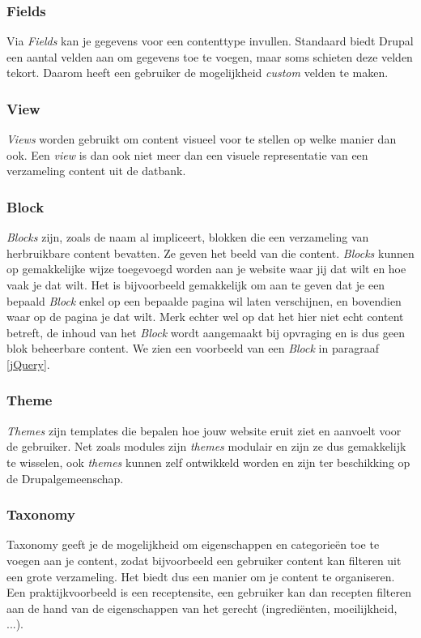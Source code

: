 \subsubsection{Fields}
Via \textit{Fields} kan je gegevens voor een contenttype invullen. Standaard biedt Drupal een aantal velden aan om gegevens toe te voegen, maar soms schieten deze velden tekort. Daarom heeft een gebruiker de mogelijkheid \textit{custom} velden te maken.

\subsubsection{View}
\textit{Views} worden gebruikt om content visueel voor te stellen op welke manier dan ook. Een \textit{view} is dan ook niet meer dan een visuele representatie van een verzameling content uit de datbank.

\subsubsection{Block}
\textit{Blocks} zijn, zoals de naam al impliceert, blokken die een verzameling van herbruikbare content bevatten. Ze geven het beeld van die content. \textit{Blocks} kunnen op gemakkelijke wijze toegevoegd worden aan je website waar jij dat wilt en hoe vaak je dat wilt. Het is bijvoorbeeld gemakkelijk om aan te geven dat je een bepaald \textit{Block} enkel op een bepaalde pagina wil laten verschijnen, en bovendien waar op de pagina je dat wilt. Merk echter wel op dat het hier niet echt content betreft, de inhoud van het \textit{Block} wordt aangemaakt bij opvraging en is dus geen blok beheerbare content. We zien een voorbeeld van een \textit{Block} in paragraaf \ref{jQuery}.

\subsubsection{Theme}
\textit{Themes} zijn templates die bepalen hoe jouw website eruit ziet en aanvoelt voor de gebruiker. Net zoals modules zijn \textit{themes} modulair en zijn ze dus gemakkelijk te wisselen, ook \textit{themes} kunnen zelf ontwikkeld worden en zijn ter beschikking op de Drupalgemeenschap.

\subsubsection{Taxonomy}
Taxonomy geeft je de mogelijkheid om eigenschappen en categorie\"{e}n toe te voegen aan je content, zodat bijvoorbeeld een gebruiker content kan filteren uit een grote verzameling. Het biedt dus een manier om je content te organiseren. Een praktijkvoorbeeld is een receptensite, een gebruiker kan dan recepten filteren aan de hand van de eigenschappen van het gerecht (ingredi\"{e}nten, moeilijkheid, ...).

